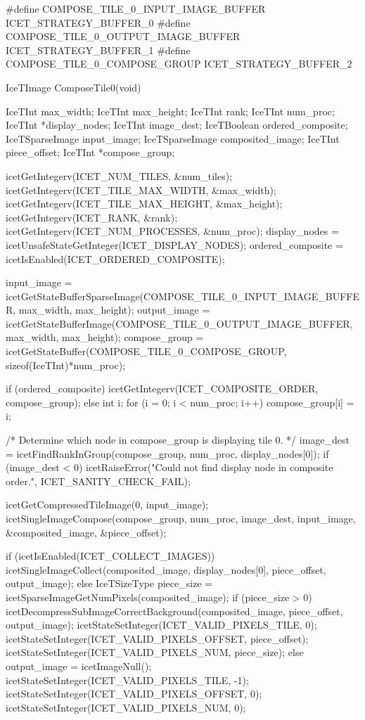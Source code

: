 \begin{code}
#define COMPOSE_TILE_0_INPUT_IMAGE_BUFFER       ICET_STRATEGY_BUFFER_0
#define COMPOSE_TILE_0_OUTPUT_IMAGE_BUFFER      ICET_STRATEGY_BUFFER_1
#define COMPOSE_TILE_0_COMPOSE_GROUP            ICET_STRATEGY_BUFFER_2

IceTImage ComposeTile0(void)
{
  IceTInt max_width;
  IceTInt max_height;
  IceTInt rank;
  IceTInt num_proc;
  IceTInt *display_nodes;
  IceTInt image_dest;
  IceTBoolean ordered_composite;
  IceTSparseImage input_image;
  IceTSparseImage composited_image;
  IceTInt piece_offset;
  IceTInt *compose_group;

  icetGetIntegerv(ICET_NUM_TILES, &num_tiles);
  icetGetIntegerv(ICET_TILE_MAX_WIDTH, &max_width);
  icetGetIntegerv(ICET_TILE_MAX_HEIGHT, &max_height);
  icetGetIntegerv(ICET_RANK, &rank);
  icetGetIntegerv(ICET_NUM_PROCESSES, &num_proc);
  display_nodes = icetUnsafeStateGetInteger(ICET_DISPLAY_NODES);
  ordered_composite = icetIsEnabled(ICET_ORDERED_COMPOSITE);

  input_image = icetGetStateBufferSparseImage(COMPOSE_TILE_0_INPUT_IMAGE_BUFFER,
                                              max_width, max_height);
  output_image = icetGetStateBufferImage(COMPOSE_TILE_0_OUTPUT_IMAGE_BUFFER,
                                         max_width, max_height);
  compose_group = icetGetStateBuffer(COMPOSE_TILE_0_COMPOSE_GROUP,
                                     sizeof(IceTInt)*num_proc);

  if (ordered_composite) {
    icetGetIntegerv(ICET_COMPOSITE_ORDER, compose_group);
  } else {
    int i;
    for (i = 0; i < num_proc; i++) {
      compose_group[i] = i;
    }
  }

  /* Determine which node in compose_group is displaying tile 0. */
  image_dest = icetFindRankInGroup(compose_group, num_proc, display_nodes[0]);
  if (image_dest < 0) {
    icetRaiseError("Could not find display node in composite order.",
                   ICET_SANITY_CHECK_FAIL);
  }

  icetGetCompressedTileImage(0, input_image);
  icetSingleImageCompose(compose_group,
                         num_proc,
                         image_dest,
                         input_image,
                         &composited_image,
                         &piece_offset);

  if (icetIsEnabled(ICET_COLLECT_IMAGES)) {
    icetSingleImageCollect(composited_image,
                           display_nodes[0],
                           piece_offset,
                           output_image);
  } else {
    IceTSizeType piece_size = icetSparseImageGetNumPixels(composited_image);
    if (piece_size > 0) {
      icetDecompressSubImageCorrectBackground(composited_image,
                                              piece_offset,
                                              output_image);
      icetStateSetInteger(ICET_VALID_PIXELS_TILE, 0);
      icetStateSetInteger(ICET_VALID_PIXELS_OFFSET, piece_offset);
      icetStateSetInteger(ICET_VALID_PIXELS_NUM, piece_size);
    } else {
      output_image = icetImageNull();
      icetStateSetInteger(ICET_VALID_PIXELS_TILE, -1);
      icetStateSetInteger(ICET_VALID_PIXELS_OFFSET, 0);
      icetStateSetInteger(ICET_VALID_PIXELS_NUM, 0);
    }
  }

}
\end{code}
